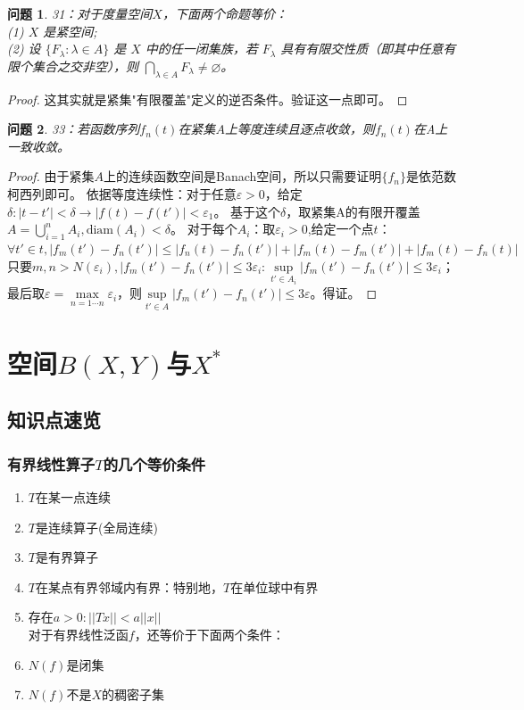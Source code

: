 \documentclass[a4paper, 12pt]{ctexart}
\newtheorem*{theorem}{问题}%
\begin{document}
\begin{theorem}
31：对于度量空间$X$，下面两个命题等价：\\
(1) $X$ 是紧空间;\\
(2) 设 $\{F_{\lambda} : \lambda \in A\}$ 是 $X$ 中的任一闭集族，若 $F_{\lambda}$ 具有有限交性质（即其中任意有限个集合之交非空），则 $\bigcap_{\lambda \in A} F_{\lambda} \neq \varnothing$。
\end{theorem}
\begin{proof}
这其实就是紧集"有限覆盖"定义的逆否条件。验证这一点即可。
\end{proof}

\begin{theorem}
33：若函数序列$f_n(t)$在紧集$A$上等度连续且逐点收敛，则$f_n(t)$在A上一致收敛。
\end{theorem}

\begin{proof}
由于紧集$A$上的连续函数空间是Banach空间，所以只需要证明$\{f_n\}$是依范数柯西列即可。
依据等度连续性：对于任意$\varepsilon>0$，给定$\delta:|t-t'|<\delta \to |f(t)-f(t')|<\varepsilon_1$。
基于这个$\delta$，取紧集A的有限开覆盖$A=\bigcup_{i=1}^n A_i,\text{diam}(A_i)<\delta$。
对于每个$A_i$：取$\varepsilon_i>0$,给定一个点$t$：$\forall t'\in t,|f_m(t')-f_n(t')|\leq |f_n(t)-f_n(t')|+|f_m(t)-f_m(t')|+|f_m(t)-f_n(t)|$
只要$m,n>N(\varepsilon_i),|f_m(t')-f_n(t')|\leq 3\varepsilon_i:\underset{t'\in A_i}{\sup}|f_m(t')-f_n(t')|\leq 3\varepsilon_i$；
最后取$\varepsilon=\underset{n=1\cdots n}{\max}{\varepsilon_i}$，则$\underset{t'\in A}{\sup}|f_m(t')-f_n(t')|\leq 3\varepsilon$。得证。
\end{proof}

\section{空间$B(X,Y)$与$X^*$}
\subsection{知识点速览}
\subsubsection{有界线性算子$T$的几个等价条件}
\begin{enumerate}
    \item $T$在某一点连续
    \item $T$是连续算子(全局连续)
    \item $T$是有界算子
    \item $T$在某点有界邻域内有界：特别地，$T$在单位球中有界
    \item 存在$a>0:||Tx||<a||x||$ \\
    对于有界线性泛函$f$，还等价于下面两个条件：
    \item $N(f)$是闭集
    \item $N(f)$不是$X$的稠密子集
\end{enumerate}
\end{document}

